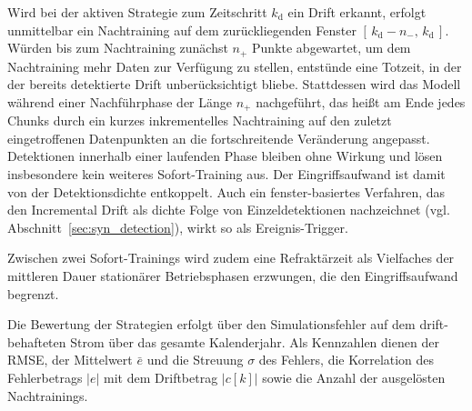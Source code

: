 Wird bei der aktiven Strategie zum Zeitschritt $k_{\mathrm{d}}$ ein Drift erkannt, erfolgt unmittelbar ein Nachtraining auf dem zurückliegenden Fenster $[\,k_{\mathrm{d}} - n_{-},\, k_{\mathrm{d}}\,]$. Würden bis zum Nachtraining zunächst $n_{+}$ Punkte abgewartet, um dem Nachtraining mehr Daten zur Verfügung zu stellen, entstünde eine Totzeit, in der der bereits detektierte Drift unberücksichtigt bliebe. Stattdessen wird das Modell während einer Nachführphase der Länge $n_{+}$ nachgeführt, das heißt am Ende jedes Chunks durch ein kurzes inkrementelles Nachtraining auf den zuletzt eingetroffenen Datenpunkten an die fortschreitende Veränderung angepasst. Detektionen innerhalb einer laufenden Phase bleiben ohne Wirkung und lösen insbesondere kein weiteres Sofort-Training aus. Der Eingriffsaufwand ist damit von der Detektionsdichte entkoppelt. Auch ein fenster-basiertes Verfahren, das den Incremental Drift als dichte Folge von Einzeldetektionen nachzeichnet (vgl. Abschnitt~\ref{sec:syn_detection}), wirkt so als Ereignis-Trigger. \par
%
Zwischen zwei Sofort-Trainings wird zudem eine Refraktärzeit als Vielfaches der mittleren Dauer stationärer Betriebsphasen erzwungen, die den Eingriffsaufwand begrenzt. \par
%
Die Bewertung der Strategien erfolgt über den Simulationsfehler auf dem drift-behafteten Strom über das gesamte Kalenderjahr. Als Kennzahlen dienen der \ac{RMSE}, der Mittelwert $\bar{e}$ und die Streuung $\sigma$ des Fehlers, die Korrelation des Fehlerbetrags $|e|$ mit dem Driftbetrag $|c[k]|$ sowie die Anzahl der ausgelösten Nachtrainings. 

